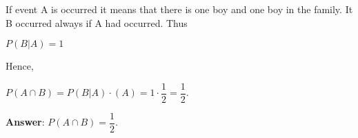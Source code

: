 \documentclass[12pt]{article}
\theoremstyle{definiton}
\theoremstyle{definition}
\theoremstyle{definition}
\begin{document}
		If event A is occurred it means that there is one boy and one boy in the family. It B occurred always if A had occurred. Thus
		
		$P\left(B|A\right) = 1$
		
		Hence, 
		
		$P(A\cap B) = P\left(B|A\right)\cdot\left(A\right) = 1 \cdot \dfrac{1}{2}=\dfrac{1}{2}$.
		
		                                                                                                                                                                                                                                                                                                                                                                                                                                                                                                                                                                                                                                                                                                                                                                                                                                                                                                                                                                                                                                                                                                                                                                                                                                                                                                                                                                                                                                                                                              		\textbf{Answer}:  $P(A\cap B) = \dfrac{1}{2}$.
\end{document}
